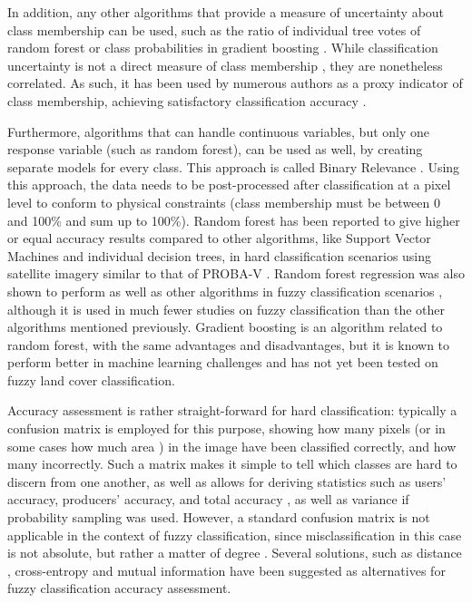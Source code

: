 \documentclass[a4paper,10pt]{article}
\begin{document}
In addition, any other algorithms that provide a measure of uncertainty about class membership can be used, such as the ratio of individual tree votes of random forest \citep{breiman2001random} or class probabilities in gradient boosting \citep{friedman2001gradientboost}. While classification uncertainty is not a direct measure of class membership \citep{sytze2000fuzzyset}, they are nonetheless correlated. As such, it has been used by numerous authors as a proxy indicator of class membership, achieving satisfactory classification accuracy \citep{foody2002accuracy}.

Furthermore, algorithms that can handle continuous variables, but only one response variable (such as random forest), can be used as well, by creating separate models for every class. This approach is called Binary Relevance \citep{karalas2016br}. Using this approach, the data needs to be post-processed after classification at a pixel level to conform to physical constraints (class membership must be between 0 and 100\% and sum up to 100\%). Random forest has been reported to give higher or equal accuracy results compared to other algorithms, like Support Vector Machines and individual decision trees, in hard classification scenarios using satellite imagery similar to that of PROBA-V \citep{duro2012algorithmcomparison}. Random forest regression was also shown to perform as well as other algorithms in fuzzy classification scenarios \citep{walton2008subpixelrf}, although it is used in much fewer studies on fuzzy classification than the other algorithms mentioned previously. Gradient boosting is an algorithm related to random forest, with the same advantages and disadvantages, but it is known to perform better in machine learning challenges \citep{chen2015higgs} and has not yet been tested on fuzzy land cover classification.

Accuracy assessment is rather straight-forward for hard classification: typically a confusion matrix is employed for this purpose, showing how many pixels (or in some cases how much area \citep{stehman2009sampling}) in the image have been classified correctly, and how many incorrectly. Such a matrix makes it simple to tell which classes are hard to discern from one another, as well as allows for deriving statistics such as users' accuracy, producers' accuracy, and total accuracy \citep{foody1996fuzzyevaluation}, as well as variance if probability sampling was used. However, a standard confusion matrix is not applicable in the context of fuzzy classification, since misclassification in this case is not absolute, but rather a matter of degree \citep{foody2002accuracy}. Several solutions, such as distance \citep{foody1996fuzzyevaluation}, cross-entropy and mutual information \citep{lu2007methods} have been suggested as alternatives for fuzzy classification accuracy assessment.
\end{document}
